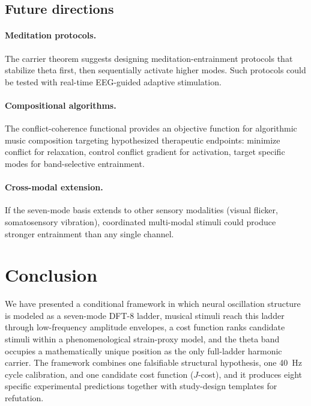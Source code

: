 \documentclass[11pt,a4paper]{article}
\begin{document}
\subsection{Future directions}

\paragraph{Meditation protocols.}
The carrier theorem suggests designing meditation-entrainment protocols
that stabilize theta first, then sequentially activate higher modes.
Such protocols could be tested with real-time EEG-guided adaptive
stimulation.

\paragraph{Compositional algorithms.}
The conflict-coherence functional provides an objective function for
algorithmic music composition targeting hypothesized therapeutic
endpoints:
minimize conflict for relaxation, control conflict gradient for
activation, target specific modes for band-selective entrainment.

\paragraph{Cross-modal extension.}
If the seven-mode basis extends to other sensory modalities (visual
flicker, somatosensory vibration), coordinated multi-modal stimuli
could produce stronger entrainment than any single channel.

\section{Conclusion}
\label{sec:conclusion}

We have presented a conditional framework in which neural oscillation
structure is modeled as a seven-mode DFT-8 ladder, musical stimuli
reach this ladder through low-frequency amplitude envelopes, a cost
function ranks candidate stimuli within a phenomenological strain-proxy
model, and the theta band occupies a mathematically unique position as
the only full-ladder harmonic carrier. The framework combines one
falsifiable structural hypothesis, one 40~Hz cycle calibration, and one
candidate cost function ($J$-cost), and it produces eight specific
experimental predictions together with study-design templates for
refutation.
\end{document}
